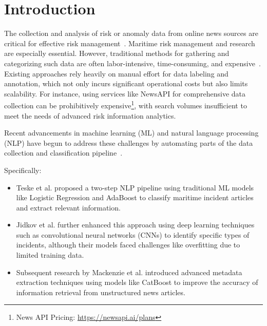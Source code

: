 \section{Introduction}

The collection and analysis of risk or anomaly data from online news sources are critical for effective risk management~\cite{wang2013understanding, wang2014anomaly}. Maritime risk management and research are especially essential. However, traditional methods for gathering and categorizing such data are often labor-intensive, time-consuming, and expensive~\cite{babelsenticnet,blending,camsta,ngulea}. Existing approaches rely heavily on manual effort for data labeling and annotation, which not only incurs significant operational costs but also limits scalability. For instance, using services like NewsAPI for comprehensive data collection can be prohibitively expensive\footnote{News API Pricing: \url{https://newsapi.ai/plans}}, with search volumes insufficient to meet the needs of advanced risk information analytics.

Recent advancements in machine learning (ML) and natural language processing (NLP) have begun to address these challenges by automating parts of the data collection and classification pipeline~\cite{nlu,7pillars,hu2023msrl,primenet,wang2023learning, jiisui,hu2021stock}. 

Specifically:
\begin{itemize}
    \item Teske et al. proposed a two-step NLP pipeline using traditional ML models like Logistic Regression and AdaBoost to classify maritime incident articles and extract relevant information\cite{teske2018automatic}.
    
    \item Jidkov et al. further enhanced this approach using deep learning techniques such as convolutional neural networks (CNNs) to identify specific types of incidents, although their models faced challenges like overfitting due to limited training data\cite{jidkov2020enabling}.
    
    \item Subsequent research by Mackenzie et al.  introduced advanced metadata extraction techniques using models like CatBoost to improve the accuracy of information retrieval from unstructured news articles\cite{mackenzie2021maritime}.
\end{itemize}

